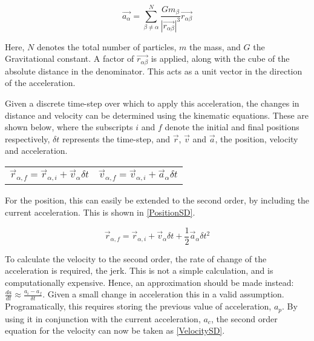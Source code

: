 \documentclass[a4paper,10pt]{article}
\begin{document}
\begin{equation} \label{Sum_a}
    \vec{a_\alpha} =  \sum\limits_{\beta\neq \alpha}^{N} \frac{G m_\beta}{\left|\vec{r_{\alpha\beta}}\right|^3}\vec{r_{\alpha\beta}}
\end{equation}

Here, $N$ denotes the total number of particles, $m$ the mass, and $G$ the Gravitational constant. A factor of $\vec{r_{\alpha\beta}}$ is applied, along with the cube of the absolute distance in the denominator. This acts as a unit vector in the direction of the acceleration.\newline  


Given a discrete time-step over which to apply this acceleration, the changes in distance and velocity can be determined using the kinematic equations. These are shown below, where the subscripts $i$ and $f$ denote the initial and final positions respectively, $\delta t$ represents the time-step, and $\vec r$, $\vec v$ and $\vec a$, the position, velocity and acceleration. %

\noindent\begin{tabularx}{\textwidth}{@{}XX@{}}
  \begin{equation*}
   \vec{r}_{\alpha,f} =  \vec{r}_{\alpha,i} + \vec{v}_{\alpha} \delta t
    \label{PositionFD}
  \end{equation*} &
  \begin{equation*}
 \vec{v}_{\alpha,f} =  \vec{v}_{\alpha,i} + \vec{a}_{\alpha} \delta t
    \label{VelocityFD}
  \end{equation*}
\end{tabularx}

For the position, this can easily be extended to the second order, by including the current acceleration. This is shown in \cref{PositionSD}.

\begin{equation} \label{PositionSD}
    \vec{r}_{\alpha,f} =  \vec{r}_{\alpha,i} + \vec{v}_{\alpha} \delta t + \frac{1}{2}\vec{a}_{\alpha}\delta t^2
\end{equation}

To calculate the velocity to the second order, the rate of change of the acceleration is required, the jerk. This is not a simple calculation, and is computationally expensive. Hence, an approximation should be made instead: $\frac{da}{dt} \approx \frac{a_i - a_f}{\delta t}$. Given a small change in acceleration this in a valid assumption. Programatically, this requires storing the previous value of acceleration, $a_p$. By using it in conjunction with the current acceleration, $a_c$, the second order equation for the velocity can now be taken as \cref{VelocitySD}.
\end{document}
